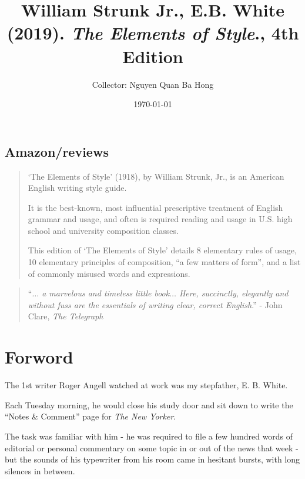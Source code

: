\documentclass{book}
\title{William Strunk Jr., E.B. White (2019). \emph{The Elements of Style}., 4th Edition}
\author{Collector: Nguyen Quan Ba Hong}
\date{\today}
\numberwithin{equation}{section}
\begin{document}
\maketitle
\setcounter{secnumdepth}{6}
\setcounter{tocdepth}{6}
\tableofcontents


\section*{Amazon/reviews}
\begin{quotation}
    `The Elements of Style' (1918), by William Strunk, Jr., is an American English writing style guide.
    
    It is the best-known, most influential prescriptive treatment of English grammar and usage, and often is required reading and usage in U.S. high school and university composition classes.
    
    This edition of `The Elements of Style' details 8 elementary rules of usage, 10 elementary principles of composition, ``a few matters of form'', and a list of commonly misused words and expressions.
\end{quotation}

\begin{quotation}
    ``\textit{$\ldots$ a marvelous and timeless little book$\ldots$ Here, succinctly, elegantly and without fuss are the essentials of writing clear, correct English}.'' - John Clare, \textit{The Telegraph}
\end{quotation}


\chapter*{Forword}

The 1st writer Roger Angell watched at work was my stepfather, E. B. White.

Each Tuesday morning, he would close his study door and sit down to write the ``Notes \& Comment'' page for \textit{The New Yorker}.

The task was familiar with him - he was required to file a few hundred words of editorial or personal commentary on some topic in or out of the news that week - but the sounds of his typewriter from his room came in hesitant bursts, with long silences in between.
\end{document}
